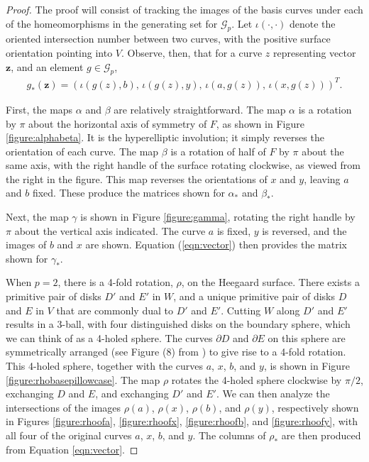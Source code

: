 \documentclass{amsart}     %
\newcommand{\bd}{\partial}
\newcommand{\io}{\iota}
\theoremstyle{definition}
\begin{document}
\begin{proof}
The proof will consist of tracking the images of the basis curves under each of the homeomorphisms in the generating set for $\mathcal{G}_p$. Let $\io(\cdot, \cdot)$ denote the oriented intersection number between two curves, with the positive surface orientation pointing into $V$. Observe, then, that for a curve $z$ representing vector $\textbf{z}$, and an element $g \in \mathcal{G}_p$, 
\begin{eqnarray} \label{eqn:vector} g_*(\textbf{z}) = (\io(g(z), b), \, \io(g(z), y), \, \io(a, g(z)), \, \io(x, g(z)))^T. \end{eqnarray} 

First, the maps $\alpha$ and $\beta$ are relatively straightforward. The map $\alpha$ is a rotation by $\pi$ about the horizontal axis of symmetry of $F$, as shown in Figure \ref{figure:alphabeta}. It is the hyperelliptic involution; it simply reverses the orientation of each curve. The map $\beta$ is a rotation of half of $F$ by $\pi$ about the same axis, with the right handle of the surface rotating clockwise, as viewed from the right in the figure. This map reverses the orientations of $x$ and $y$, leaving $a$ and $b$ fixed. These produce the matrices shown for $\alpha_*$ and $\beta_*$.

Next, the map $\gamma$ is shown in Figure \ref{figure:gamma}, rotating the right handle by $\pi$ about the vertical axis indicated. The curve $a$ is fixed, $y$ is reversed, and the images of $b$ and $x$ are shown. Equation (\ref{eqn:vector}) then provides the matrix shown for $\gamma_*$.

When $p=2$, there is a 4-fold rotation, $\rho$, on the Heegaard surface. There exists a primitive pair of disks $D'$ and $E'$ in $W$, and a unique primitive pair of disks $D$ and $E$ in $V$ that are commonly dual to $D'$ and $E'$. Cutting $W$ along $D'$ and $E'$ results in a 3-ball, with four distinguished disks on the boundary sphere, which we can think of as a 4-holed sphere. The curves $\bd D$ and $\bd E$ on this sphere are symmetrically arranged (see Figure (8) from \cite{ChoG2GGLS}) to give rise to a 4-fold rotation. This 4-holed sphere, together with the curves $a$, $x$, $b$, and $y$, is shown in Figure \ref{figure:rhobasepillowcase}. The map $\rho$ rotates the 4-holed sphere clockwise by $\pi/2$, exchanging $D$ and $E$, and exchanging $D'$ and $E'$. We can then analyze the intersections of the images $\rho(a)$, $\rho(x)$, $\rho(b)$, and $\rho(y)$, respectively shown in Figures \ref{figure:rhoofa}, \ref{figure:rhoofx}, \ref{figure:rhoofb}, and \ref{figure:rhoofy}, with all four of the original curves $a$, $x$, $b$, and $y$. The columns of $\rho_*$ are then produced from Equation \ref{eqn:vector}.


\end{proof}
\end{document}
